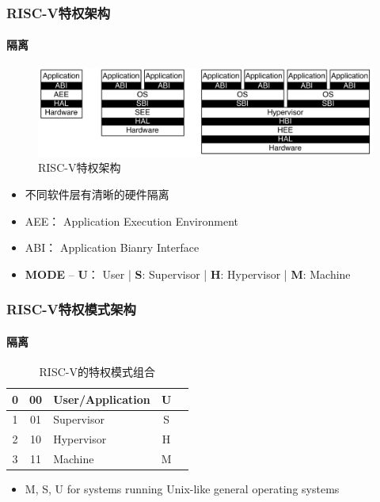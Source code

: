 \documentclass[UTF8]{ctexbeamer}
\begin{document}
\begin{frame}
	\frametitle{RISC-V特权架构}
	\framesubtitle{隔离}
	
	\begin{figure}
	\centering
	\includegraphics[width=0.9\linewidth]{rv-privil-arch}
	\caption{RISC-V特权架构}
	\end{figure}

\begin{itemize}
	
	\item 不同软件层有清晰的硬件隔离
	\item AEE： Application Execution Environment
	\item ABI： Application Bianry Interface
	\item \textbf{MODE} -- \textbf{U}： User | \textbf{S}: Supervisor | \textbf{H}: Hypervisor | \textbf{M}: Machine

\end{itemize}

\end{frame}

\begin{frame}
		\frametitle{RISC-V特权模式架构}
		\framesubtitle{隔离}
\begin{table}[h]
	\caption{RISC-V的特权模式组合}
 	\centering
 	\begin{tabular}{|c|c|l|c|l|}
 	\hline
	0 & 00 & User/Application & U \\\hline
	1 & 01 & Supervisor & S \\\hline
	2 & 10 & Hypervisor & H \\\hline
	3 & 11 & Machine & M \\\hline
   \end{tabular}

\begin{itemize}
	
	\item M, S, U  for systems running Unix-like general operating systems
\end{itemize}


\end{table}
\end{frame}
\end{document}
